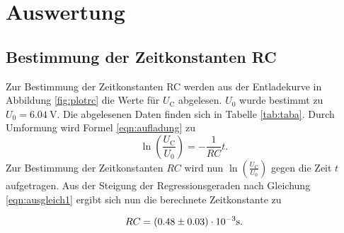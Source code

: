 \section{Auswertung}
\label{sec:Auswertung}
\subsection{Bestimmung der Zeitkonstanten RC}
\label{sec:RC}
Zur Bestimmung der Zeitkonstanten RC werden aus der Entladekurve in Abbildung \ref{fig:plotrc} die Werte für $U_\text{C}$ abgelesen.
$U_\text{0}$ wurde bestimmt zu $U_\text{0}=\SI{6.04}{\volt}$.
Die abgelesenen Daten finden sich in Tabelle \ref{tab:taba}.
Durch Umformung wird Formel \eqref{eqn:aufladung} zu
\begin{equation}
	\label{eqn:ausgleich1}
	\ln\left(\frac{U_\text{C}}{U_\text{0}}\right)=-\frac{1}{RC}t .
\end{equation}
Zur Bestimmung der Zeitkonstanten $RC$ wird nun $\ln\left(\frac{U_\text{C}}{U_\text{0}}\right)$ gegen die Zeit $t$ aufgetragen.
Aus der Steigung der Regressionsgeraden nach Gleichung \eqref{eqn:ausgleich1} ergibt sich nun die berechnete Zeitkonstante zu

\begin{equation*}
	\centering
	RC = (0.48 \pm 0.03) \cdot 10^{-3} \si{\second} .
\end{equation*}

